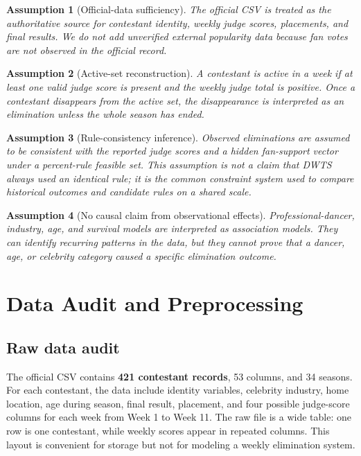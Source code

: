 \documentclass[12pt]{article}
\newtheorem{assumption}{Assumption}
\begin{document}
\begin{assumption}[Official-data sufficiency]
The official CSV is treated as the authoritative source for contestant
identity, weekly judge scores, placements, and final results. We do not add
unverified external popularity data because fan votes are not observed in the
official record.
\end{assumption}

\begin{assumption}[Active-set reconstruction]
A contestant is active in a week if at least one valid judge score is present
and the weekly judge total is positive. Once a contestant disappears from the
active set, the disappearance is interpreted as an elimination unless the whole
season has ended.
\end{assumption}

\begin{assumption}[Rule-consistency inference]
Observed eliminations are assumed to be consistent with the reported judge
scores and a hidden fan-support vector under a percent-rule feasible set. This
assumption is not a claim that DWTS always used an identical rule; it is the
common constraint system used to compare historical outcomes and candidate
rules on a shared scale.
\end{assumption}

\begin{assumption}[No causal claim from observational effects]
Professional-dancer, industry, age, and survival models are interpreted as
association models. They can identify recurring patterns in the data, but they
cannot prove that a dancer, age, or celebrity category caused a specific
elimination outcome.
\end{assumption}

\section{Data Audit and Preprocessing}

\subsection{Raw data audit}

The official CSV contains \textbf{421 contestant records}, 53 columns, and 34 seasons.
For each contestant, the data include identity variables, celebrity industry,
home location, age during season, final result, placement, and four possible
judge-score columns for each week from Week 1 to Week 11. The raw file is a wide
table: one row is one contestant, while weekly scores appear in repeated
columns. This layout is convenient for storage but not for modeling a weekly
elimination system.
\end{document}
